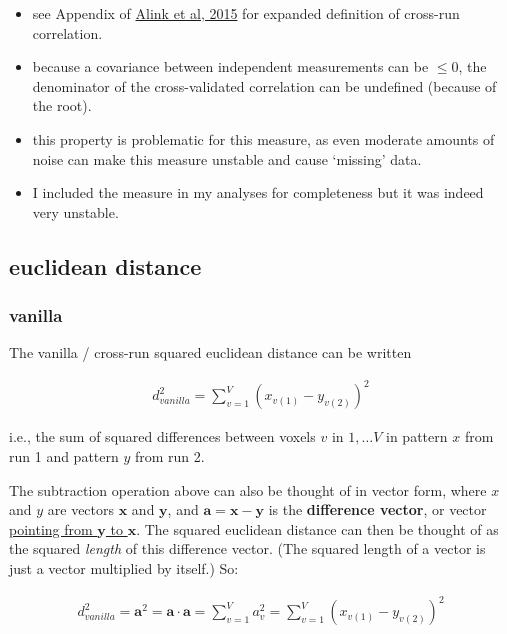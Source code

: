 \documentclass{article}\usepackage[]{graphicx}\usepackage[]{color}
\begin{document}
\begin{itemize}
  \item see Appendix of \href{https://www.biorxiv.org/content/10.1101/032391v2}{Alink et al, 2015} for expanded definition of cross-run correlation.
  \item because a covariance between independent measurements can be $\leq 0$, the denominator of the cross-validated correlation can be undefined (because of the root).
  \item this property is problematic for this measure, as even moderate amounts of noise can make this measure unstable and cause `missing' data.
  \item I included the measure in my analyses for completeness but it was indeed very unstable.
\end{itemize}


\subsection*{euclidean distance}

\subsubsection*{vanilla}

The vanilla / cross-run squared euclidean distance can be written

\begin{align*}
  d^2_\textit{vanilla} = \sum_{v = 1}^{V}(x_{v(1)} - y_{v(2)})^2
\end{align*}

i.e., the sum of squared differences between voxels $v$ in $1, \dots V$ in pattern $x$ from run 1 and pattern $y$ from run 2.

The subtraction operation above can also be thought of in vector form, where $x$ and $y$ are vectors $\mathbf{x}$ and $\mathbf{y}$, and $\mathbf{a} = \mathbf{x} - \mathbf{y}$ is the \textbf{difference vector}, or vector
\href{https://www.google.com/search?q=vector+subtraction&client=firefox-b-1-d&sxsrf=ALeKk00syNVDPLbGdMF_spS_wgfJXqp50A:1589025736959&source=lnms&tbm=isch&sa=X&ved=2ahUKEwih_9uU3qbpAhVGK80KHT5hB4EQ_AUoAXoECA4QAw&biw=2400&bih=1185#imgrc=Tjt-W0VN7s-a4M}{pointing from $\mathbf{y}$ to $\mathbf{x}$}.
The squared euclidean distance can then be thought of as the squared \textit{length} of this difference vector.
(The squared length of a vector is just a vector multiplied by itself.)
So:

\begin{align}
  d^2_\textit{vanilla} = \mathbf{a}^2 = \mathbf{a} \cdot \mathbf{a} = \sum_{v = 1}^V a_v^2 =  \sum_{v = 1}^{V}(x_{v(1)} - y_{v(2)})^2
\end{align}
\end{document}

